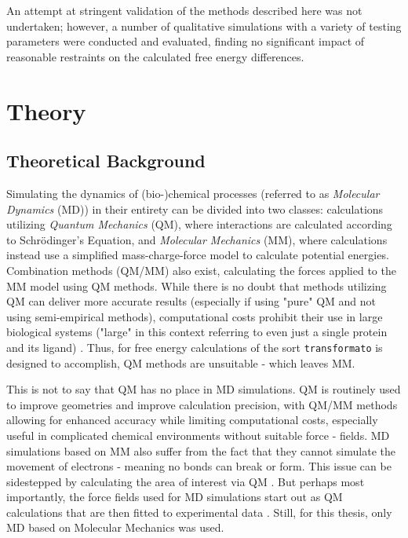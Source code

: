 \documentclass[oneside]{scrreprt}
\begin{document}
An attempt at stringent validation of the methods described here was not undertaken; however, a number of qualitative simulations with a variety of testing parameters were conducted and evaluated, finding no significant impact of reasonable restraints on the calculated free energy differences.
\chapter{Theory}

\section{Theoretical Background}
Simulating the dynamics of (bio-)chemical processes (referred to as \emph{Molecular Dynamics} (MD)) in their entirety can be divided into two classes: calculations utilizing \emph{Quantum Mechanics} (QM), where interactions are calculated according to Schrödinger's Equation, and \emph{Molecular Mechanics} (MM), where calculations instead use a simplified mass-charge-force model to calculate potential energies. Combination methods (QM/MM) also exist, calculating the forces applied to the MM model using QM methods.  While there is no doubt that methods utilizing QM can deliver more accurate results (especially if using "pure" QM and not using semi-empirical methods), computational costs prohibit their use in large biological systems ("large" in this context referring to even just a single protein and its ligand) \cite{cournia_relative_2017}. Thus, for free energy calculations of the sort \texttt{transformato} is designed to accomplish, QM methods are unsuitable - which leaves MM.

This is not to say that QM has no place in MD simulations. QM is routinely used to improve geometries and improve calculation precision, with QM/MM methods allowing for enhanced accuracy while limiting computational costs, especially useful in complicated chemical environments without suitable force - fields. MD simulations based on MM also suffer from the fact that they cannot simulate the movement of electrons - meaning no bonds can break or form. This issue can be sidestepped by calculating the area of interest via QM \cite{tzeliou_review_2022}. But perhaps most importantly, the force fields used for MD simulations start out as QM calculations that are then fitted to experimental data \cite{vanommeslaeghe_charmm_2010}. Still, for this thesis, only MD based on Molecular Mechanics was used.
\end{document}
